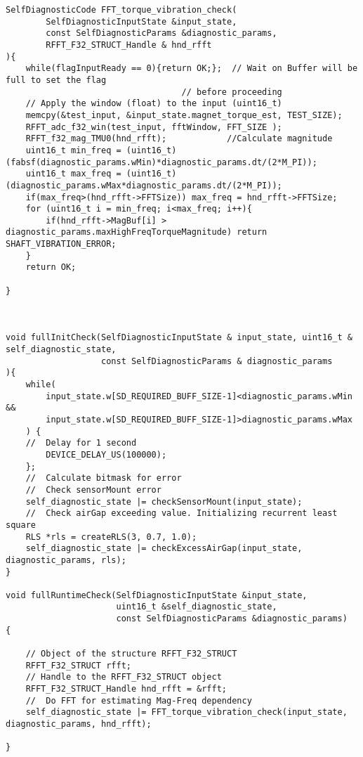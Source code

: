 \begin{lstlisting}[caption=\raggedright{mcu-libs/RLS.h}, frame=single]
SelfDiagnosticCode FFT_torque_vibration_check(
        SelfDiagnosticInputState &input_state,
        const SelfDiagnosticParams &diagnostic_params,
        RFFT_F32_STRUCT_Handle & hnd_rfft
){
    while(flagInputReady == 0){return OK;};  // Wait on Buffer will be full to set the flag
                                   // before proceeding
    // Apply the window (float) to the input (uint16_t)
    memcpy(&test_input, &input_state.magnet_torque_est, TEST_SIZE);
    RFFT_adc_f32_win(test_input, fftWindow, FFT_SIZE );
    RFFT_f32_mag_TMU0(hnd_rfft);            //Calculate magnitude
    uint16_t min_freq = (uint16_t)(fabsf(diagnostic_params.wMin)*diagnostic_params.dt/(2*M_PI));
    uint16_t max_freq = (uint16_t)(diagnostic_params.wMax*diagnostic_params.dt/(2*M_PI));
    if(max_freq>(hnd_rfft->FFTSize)) max_freq = hnd_rfft->FFTSize;
    for (uint16_t i = min_freq; i<max_freq; i++){
        if(hnd_rfft->MagBuf[i] > diagnostic_params.maxHighFreqTorqueMagnitude) return SHAFT_VIBRATION_ERROR;
    }
    return OK;

}



void fullInitCheck(SelfDiagnosticInputState & input_state, uint16_t & self_diagnostic_state,
                   const SelfDiagnosticParams & diagnostic_params
){
    while(
        input_state.w[SD_REQUIRED_BUFF_SIZE-1]<diagnostic_params.wMin &&
        input_state.w[SD_REQUIRED_BUFF_SIZE-1]>diagnostic_params.wMax
    ) {
    //  Delay for 1 second
        DEVICE_DELAY_US(100000);
    };
    //  Calculate bitmask for error
    //  Check sensorMount error
    self_diagnostic_state |= checkSensorMount(input_state);
    //  Check airGap exceeding value. Initializing recurrent least square
    RLS *rls = createRLS(3, 0.7, 1.0);
    self_diagnostic_state |= checkExcessAirGap(input_state, diagnostic_params, rls);
}

void fullRuntimeCheck(SelfDiagnosticInputState &input_state,
                      uint16_t &self_diagnostic_state,
                      const SelfDiagnosticParams &diagnostic_params)
{

    // Object of the structure RFFT_F32_STRUCT
    RFFT_F32_STRUCT rfft;
    // Handle to the RFFT_F32_STRUCT object
    RFFT_F32_STRUCT_Handle hnd_rfft = &rfft;
    //  Do FFT for estimating Mag-Freq dependency
    self_diagnostic_state |= FFT_torque_vibration_check(input_state, diagnostic_params, hnd_rfft);

}

\end{lstlisting}